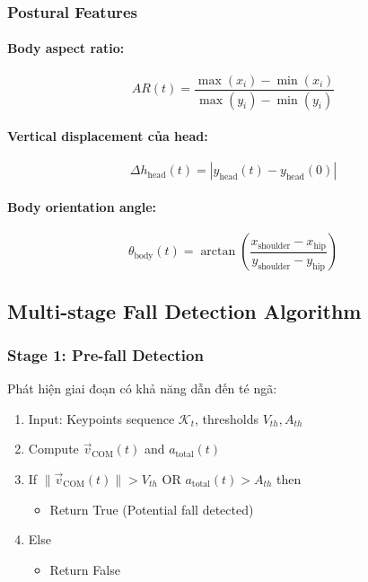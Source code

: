 \subsubsection{Postural Features}
\paragraph{Body aspect ratio:}
\begin{equation}
AR(t) = \frac{\max(x_i) - \min(x_i)}{\max(y_i) - \min(y_i)}
\end{equation}

\paragraph{Vertical displacement của head:}
\begin{equation}
\Delta h_{\text{head}}(t) = |y_{\text{head}}(t) - y_{\text{head}}(0)|
\end{equation}

\paragraph{Body orientation angle:}
\begin{equation}
\theta_{\text{body}}(t) = \arctan\left(\frac{x_{\text{shoulder}} - x_{\text{hip}}}{y_{\text{shoulder}} - y_{\text{hip}}}\right)
\end{equation}

\subsection{Multi-stage Fall Detection Algorithm}

\subsubsection{Stage 1: Pre-fall Detection}
Phát hiện giai đoạn có khả năng dẫn đến té ngã:
\begin{enumerate}
\item Input: Keypoints sequence $\mathcal{K}_t$, thresholds $V_{th}, A_{th}$
\item Compute $\vec{v}_{\text{COM}}(t)$ and $a_{\text{total}}(t)$
\item If $\|\vec{v}_{\text{COM}}(t)\| > V_{th}$ OR $a_{\text{total}}(t) > A_{th}$ then
\begin{itemize}
    \item Return True (Potential fall detected)
\end{itemize}
\item Else
\begin{itemize}
    \item Return False
\end{itemize}
\end{enumerate}


